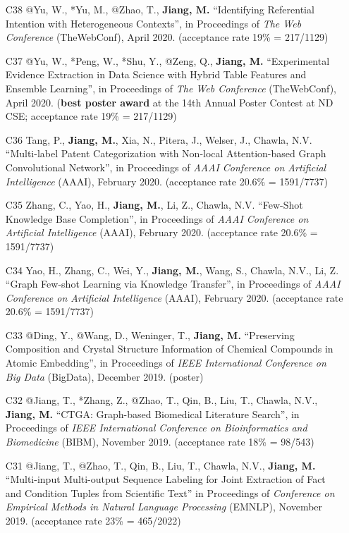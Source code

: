 \documentclass[10pt]{article}
\newenvironment{myindentpar}[1]%
{\begin{list}{}%
         {\setlength{\leftmargin}{#1}}%
         \item[]%
}
{\end{list}}
\newcounter{list}
\begin{document}
\begin{myindentpar}{0.00cm}
\begin{enumerate}[leftmargin=.5cm]
\item[C38] @Yu, W., *Yu, M., @Zhao, T., \textbf{Jiang, M.} ``Identifying Referential Intention with Heterogeneous Contexts'', in Proceedings of \textit{The Web Conference} (TheWebConf), April 2020. (acceptance rate 19\% = 217/1129)

\item[C37] @Yu, W., *Peng, W., *Shu, Y., @Zeng, Q., \textbf{Jiang, M.} ``Experimental Evidence Extraction in Data Science with Hybrid Table Features and Ensemble Learning'', in Proceedings of \textit{The Web Conference} (TheWebConf), April 2020. (\textbf{best poster award} at the 14th Annual Poster Contest at ND CSE; acceptance rate 19\% = 217/1129)

\item[C36] Tang, P., \textbf{Jiang, M.}, Xia, N., Pitera, J., Welser, J., Chawla, N.V. ``Multi-label Patent Categorization with Non-local Attention-based Graph Convolutional Network'', in Proceedings of \textit{AAAI Conference on Artificial Intelligence} (AAAI), February 2020. (acceptance rate 20.6\% = 1591/7737)
	
\item[C35] Zhang, C., Yao, H., \textbf{Jiang, M.}, Li, Z., Chawla, N.V. ``Few-Shot Knowledge Base Completion'', in Proceedings of \textit{AAAI Conference on Artificial Intelligence} (AAAI), February 2020. (acceptance rate 20.6\% = 1591/7737)

\item[C34] Yao, H., Zhang, C., Wei, Y., \textbf{Jiang, M.}, Wang, S., Chawla, N.V., Li, Z. ``Graph Few-shot Learning via Knowledge Transfer'', in Proceedings of \textit{AAAI Conference on Artificial Intelligence} (AAAI), February 2020. (acceptance rate 20.6\% = 1591/7737)

\item[C33] @Ding, Y., @Wang, D., Weninger, T., \textbf{Jiang, M.} ``Preserving Composition and Crystal Structure Information of Chemical Compounds in Atomic Embedding'', in Proceedings of \textit{IEEE International Conference on Big Data} (BigData), December 2019. (poster)

\item[C32] @Jiang, T., *Zhang, Z., @Zhao, T., Qin, B., Liu, T., Chawla, N.V., \textbf{Jiang, M.} ``CTGA: Graph-based Biomedical Literature Search'', in Proceedings of \textit{IEEE International Conference on Bioinformatics and Biomedicine} (BIBM), November 2019. (acceptance rate 18\% = 98/543)

\item[C31] @Jiang, T., @Zhao, T., Qin, B., Liu, T., Chawla, N.V., \textbf{Jiang, M.} ``Multi-input Multi-output Sequence Labeling for Joint Extraction of Fact and Condition Tuples from Scientific Text'' in Proceedings of \textit{Conference on Empirical Methods in Natural Language Processing} (EMNLP), November 2019. (acceptance rate 23\% = 465/2022)


\end{enumerate}
\end{myindentpar}
\end{document}
